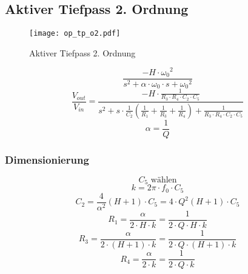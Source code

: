 



\subsection{Aktiver Tiefpass 2. Ordnung}
\label{filt:o2-tp}
\begin{figure}[h!]
	\centering
	\texttt{[image: op\_tp\_o2.pdf]}
	\caption{Aktiver Tiefpass 2. Ordnung}
	\label{sch:op-tp-o2}
\end{figure}
\[ \frac{-H \cdot {\omega_0}^2}
{s^2 + \alpha \cdot \omega_0 \cdot s + {\omega_0}^2} \]
\[ \frac{V_{out}}{V_{in}} 
= \frac{-H \cdot \frac{1}{R_3 \cdot R_4 \cdot C_2 \cdot C_5}}
{s^2 + s \cdot \frac{1}{C_2} 
\left(\frac{1}{R_1} + \frac{1}{R_3} + \frac{1}{R_4}\right) 
+ \frac{1}{R_3 \cdot R_4 \cdot C_2 \cdot C_5}} \]
\[ \alpha = \frac{1}{Q} \]

\subsubsection{Dimensionierung}
\[ C_5 \text{ wählen} \]
\[ k = 2 \pi \cdot f_0 \cdot C_5 \]
\[ C_2 = \frac{4}{\alpha^2} (H + 1) \cdot C_5 
= 4 \cdot Q^2 (H + 1) \cdot C_5 \]
\[ R_1 = \frac{\alpha}{2 \cdot H \cdot k} 
= \frac{1}{2 \cdot Q \cdot H \cdot k} \]
\[ R_3 = \frac{\alpha}{2 \cdot (H + 1) \cdot k} 
= \frac{1}{2 \cdot Q \cdot (H + 1) \cdot k} \]
\[ R_4 = \frac{\alpha}{2 \cdot k} = \frac{1}{2 \cdot Q \cdot k} \]
